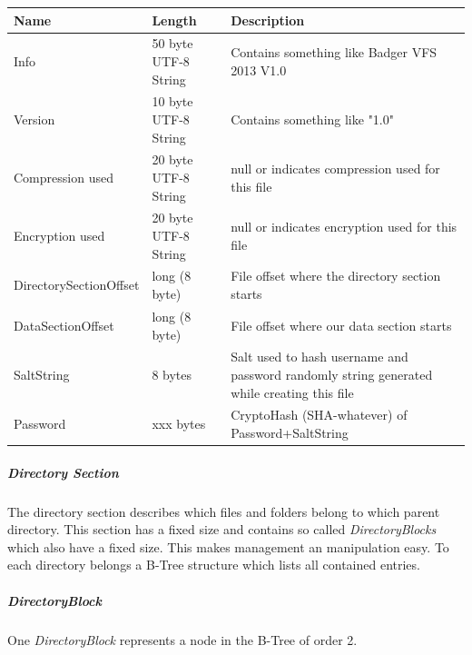 \begin{tabular}{|l|l|p{5cm}|}
\hline
  \textbf{Name} & \textbf{Length} & \textbf{Description}
\\  \hline
  Info & 50 byte UTF-8 String & Contains something like Badger VFS 2013 V1.0 
\\ \hline
  Version & 10 byte UTF-8 String & Contains something like "1.0"
\\ \hline
  Compression used & 20 byte UTF-8 String & null or indicates compression used for this file
\\ \hline
  Encryption used & 20 byte UTF-8 String & null or indicates encryption used for this file
\\ \hline
 DirectorySectionOffset & long (8 byte) &  File offset where the directory
 section starts \\ \hline
 DataSectionOffset & long (8 byte) &  File offset where our data section starts
\\ \hline
 SaltString & 8 bytes  & Salt used to hash username and password randomly string generated while creating this
   file
 \\ \hline
  Password & xxx bytes  & CryptoHash (SHA-whatever) of Password+SaltString
\\ \hline

\end{tabular}


\subparagraph{Directory Section}
The directory section describes which files and folders belong to which parent
directory. This section has a fixed size and contains so called
\textit{DirectoryBlocks} which also have a fixed size. This makes management an
manipulation easy. To each directory belongs a B-Tree structure which lists all
contained entries.


\subparagraph*{DirectoryBlock}

One \textit{DirectoryBlock} represents a node in the B-Tree of order 2.

